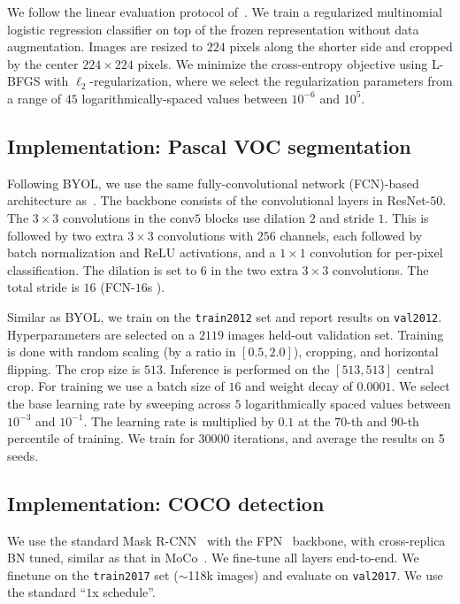 \documentclass[final]{cvpr}
\begin{document}
We follow the linear evaluation protocol of~\cite{kolesnikov2019revisiting,kornblith2019better,chen2020simple,grill2020bootstrap}. 
We train a regularized multinomial logistic regression classifier on top of the frozen representation without data augmentation. Images are resized to $224$ pixels along the shorter side and cropped by the center $224 \times 224$ pixels.
We minimize the cross-entropy objective using L-BFGS with $\ell_2$-regularization, where we select the regularization parameters from a range of $45$ logarithmically-spaced values between $10^{-6}$ and $10^5$. 

\subsection{Implementation: Pascal VOC segmentation}

Following BYOL, we use the same fully-convolutional network (FCN)-based~\cite{long2015fully} architecture as~\cite{he2020momentum}. The backbone consists of the convolutional layers in ResNet-$50$. The $3\times 3$ convolutions in the conv$5$ blocks use dilation $2$ and stride $1$. This is followed by two extra $3\times 3$ convolutions with $256$ channels, each followed by batch normalization and ReLU activations, and a $1\times 1$ convolution for per-pixel classification. The dilation is set to $6$ in the two extra $3\times 3$ convolutions. The total stride is $16$ (FCN-$16$s \cite{long2015fully}).

Similar as BYOL, we train on the \texttt{train2012\xspace} set and report results on \texttt{val2012\xspace}. Hyperparameters are selected on a $2119$ images held-out validation set. Training is done with random scaling (by a ratio in $\left[0.5, 2.0\right]$), cropping, and horizontal flipping. The crop size is $513$. Inference is performed on the $\left[513, 513\right]$ central crop. For training we use a batch size of $16$ and weight decay of $0.0001$. We select the base learning rate by sweeping across $5$ logarithmically spaced values between $10^{-3}$ and $10^{-1}$. The learning rate is multiplied by $0.1$ at the $70$-th and $90$-th percentile of training. We train for $30000$ iterations, and average the results on 5 seeds.

\subsection{Implementation: COCO detection}

We use the standard Mask R-CNN~\cite{he2017mask} with the FPN~\cite{lin2017feature} backbone, with cross-replica BN tuned, similar as that in MoCo~\cite{he2020momentum}. We fine-tune all layers end-to-end. We finetune on the \texttt{train2017} set ($\sim$118k images) and evaluate on \texttt{val2017}. We use the standard ``$1$x schedule''. 
\end{document}
